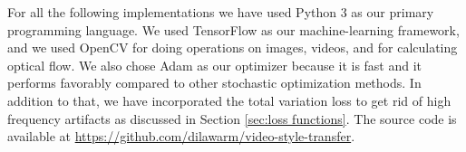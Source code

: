 For all the following implementations we have used Python 3 as our primary programming language. We used TensorFlow as our machine-learning framework, and we used OpenCV for doing operations on images, videos, and for calculating optical flow. We also chose Adam as our optimizer because it is fast and it performs favorably compared to other stochastic optimization methods. In addition to that, we have incorporated the total variation loss to get rid of high frequency artifacts as discussed in Section \ref{sec:loss functions}. The source code is available at \url{https://github.com/dilawarm/video-style-transfer}.